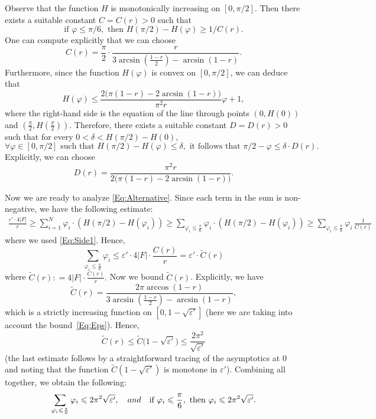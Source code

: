 \documentclass[11pt, oneside]{amsart}
\renewcommand{\tilde}{\widetilde}
\renewcommand{\phi}{\varphi}
\newcommand{\eps}{\varepsilon}
\renewcommand{\ge}{\geqslant}
\renewcommand{\le}{\leqslant}
\theoremstyle{theorem}
\theoremstyle{Intro}
\theoremstyle{definition}
\theoremstyle{remark}
\theoremstyle{claim}
\numberwithin{equation}{section}
\begin{document}
Observe that the function $H$ is monotonically increasing on $[0, \pi/2]$. 
Then there exists a suitable constant $C = C(r)>0$ such that 
\begin{equation}
\label{Eq:Side1}
\text{if } \phi \le \pi/6, \text{ then }H(\pi/2)-H(\phi) \ge 1/C(r). 
\end{equation}
One can compute explicitly that we can choose
\[
C(r) = \frac{\pi}{2} \cdot \frac{r}{3\arcsin\left(\frac{1-r}{2}\right) -\arcsin(1-r)}.
\]
Furthermore, since the function $H(\phi)$ is convex on $[0, \pi/2]$, we can deduce that
\[
H(\phi) \le \frac{2\big(\pi(1 - r) - 2\arcsin(1-r)\big)}{\pi^2 r} \phi + 1,
\]  
where the right-hand side is the equation of the line through points $(0, H(0))$ and $(\frac{\pi}2, H(\frac{\pi}2))$. Therefore, there exists a suitable constant $D = D(r) > 0$ such that for every $0< \delta < H(\pi/2)-H(0)$,
\begin{equation}
\label{Eq:Side2}
\forall \phi \in [0, \pi/2] \text{ such that }H(\pi/2) - H(\phi) \le \delta, \text{ it follows that }\pi/2- \phi \le \delta \cdot D(r).  
\end{equation}
Explicitly, we can choose
\[
D(r) = \frac{\pi^2 r}{2\big(\pi(1 - r) - 2\arcsin(1-r)\big)}.
\]

Now we are ready to analyze \eqref{Eq:Alternative}. Since each term in the sum is non-negative, we have the following estimate:
\begin{align*}
    \frac{\eps' \cdot 4|F|}{r} \ge \sum_{i=1}^N \phi_i \cdot (H(\pi/2) - H(\phi_i)) \ge  \sum_{\phi_i \le \frac{\pi}6} \phi_i \cdot (H(\pi/2) - H(\phi_i)) \ge \sum_{\phi_i \le \frac{\pi}6} \phi_i \, \frac1{C(r)}
\end{align*}
where we used \eqref{Eq:Side1}. Hence,
$$
\sum_{\phi_i \le \frac{\pi}6} \phi_i \le \eps' \cdot 4|F| \cdot \frac{C(r)}{r} = \eps' \cdot \tilde C(r)
$$
where $\tilde C(r) : =4|F| \cdot \frac{C(r)}{r}.$ Now we bound $\tilde C(r)$. Explicitly, we have
\[
\tilde C(r) = \frac{2\pi \arccos(1-r)}{3\arcsin\left(\frac{1-r}{2}\right) -\arcsin(1-r)},
\]
which is a strictly increasing function on $[0, 1-\sqrt{\eps'}]$ (here we are taking into account the bound~\eqref{Eq:Eps}). Hence,
\[
\tilde C(r) \le \tilde C\big(1-\sqrt{\eps'}\big) \le \frac{2\pi^2}{\sqrt{\eps'}}
\] 
(the last estimate follows by a straightforward tracing of the asymptotics at $0$ and noting that the function $\tilde C(1-\sqrt{\eps'})$ is monotone in $\eps'$). Combining all together, we obtain the following: 
\begin{equation}
\label{Eq:BS1}
\sum_{\phi_i \le \frac{\pi}6} \phi_i \le 2 \pi^2 \sqrt{\eps'}, \quad \textup{and} \quad \text{if } \phi_i \le \frac{\pi}{6}, \text{ then }\phi_i \le 2 \pi^2 \sqrt{\eps'}.
\end{equation}
\end{document}
